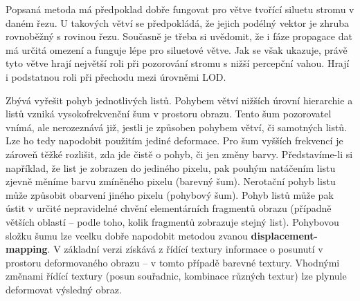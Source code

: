 Popsaná metoda má předpoklad dobře fungovat pro větve tvořící siluetu stromu v daném řezu. U takových větví se předpokládá, že jejich podélný vektor je zhruba rovnoběžný s rovinou řezu. Současně je třeba si uvědomit, že i fáze propagace dat má určitá omezení a funguje lépe pro siluetové větve. Jak se však ukazuje, právě tyto větve hrají největší roli při pozorování stromu s nižší percepční vahou. Hrají i podstatnou roli při přechodu mezi úrovněmi LOD.

Zbývá vyřešit pohyb jednotlivých listů. Pohybem větví nižších úrovní hierarchie a listů vzniká vysokofrekvenční šum v prostoru obrazu. Tento šum pozorovatel vnímá, ale nerozeznává již, jestli je způsoben pohybem větví, či samotných listů. Lze ho tedy napodobit použitím jediné deformace. Pro šum vyšších frekvencí je zároveň těžké rozlišit, zda jde čistě o pohyb, či jen změny barvy. Představíme-li si například, že list je zobrazen do jediného pixelu, pak pouhým natáčením listu zjevně měníme barvu zmíněného pixelu (barevný šum). Nerotační pohyb listu může způsobit obarvení jiného pixelu (pohybový šum). Pohyb listů může pak ústit v určité nepravidelné chvění elementárních fragmentů obrazu (případně větších oblastí – podle toho, kolik fragmentů zobrazuje stejný list).
Pohybovou složku šumu lze vcelku dobře napodobit metodou zvanou {\bf displacement-mapping}. V základní verzi získává z řídící textury informace o posunutí v prostoru deformovaného obrazu – v tomto případě barevné textury. Vhodnými změnami řídící textury (posun souřadnic, kombinace různých textur) lze plynule deformovat výsledný obraz. 
